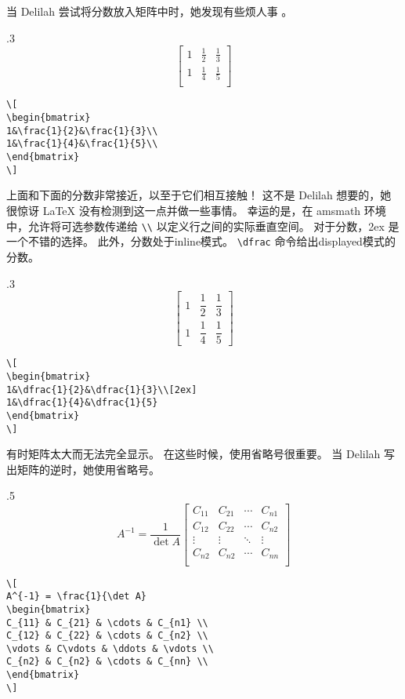 当 Delilah 尝试将分数放入矩阵中时，她发现有些烦人事
。\begin{miniexammar}{.3\textandmarginlen}{
\[
\begin{bmatrix}
1&\frac{1}{2}&\frac{1}{3}\\
1&\frac{1}{4}&\frac{1}{5}\\
\end{bmatrix}
\]
}
\begin{lstlisting}
\[
\begin{bmatrix}
1&\frac{1}{2}&\frac{1}{3}\\
1&\frac{1}{4}&\frac{1}{5}\\
\end{bmatrix}
\]
\end{lstlisting}
\end{miniexammar}
上面和下面的分数非常接近，以至于它们相互接触！ 这不是 Delilah 想要的，她很惊讶 \LaTeX{} 没有检测到这一点并做一些事情。 幸运的是，在 amsmath 环境中，允许将可选参数传递给 \verb=\\= 以定义行之间的实际垂直空间。 对于分数，2ex 是一个不错的选择。 此外，分数处于inline模式。 \verb=\dfrac= 命令给出displayed模式的分数。
\begin{miniexammar}{.3\textandmarginlen}{
\[
\begin{bmatrix}
1&\dfrac{1}{2}&\dfrac{1}{3}\\[2ex]
1&\dfrac{1}{4}&\dfrac{1}{5}
\end{bmatrix}
\]
}
\begin{lstlisting}
\[
\begin{bmatrix}
1&\dfrac{1}{2}&\dfrac{1}{3}\\[2ex]
1&\dfrac{1}{4}&\dfrac{1}{5}
\end{bmatrix}
\]
\end{lstlisting}
\end{miniexammar}

有时矩阵太大而无法完全显示。 在这些时候，使用省略号很重要。 当 Delilah 写出矩阵的逆时，她使用省略号。
\begin{miniexammar}{.5\textandmarginlen}{
\[
A^{-1} = \frac{1}{\det A}
\begin{bmatrix}
C_{11} & C_{21} & \cdots & C_{n1} \\
C_{12} & C_{22} & \cdots & C_{n2} \\
\vdots & \vdots & \ddots & \vdots \\
C_{n2} & C_{n2} & \cdots & C_{nn} \\
\end{bmatrix}
\]
}
\begin{lstlisting}
\[
A^{-1} = \frac{1}{\det A}
\begin{bmatrix}
C_{11} & C_{21} & \cdots & C_{n1} \\
C_{12} & C_{22} & \cdots & C_{n2} \\
\vdots & C\vdots & \ddots & \vdots \\
C_{n2} & C_{n2} & \cdots & C_{nn} \\
\end{bmatrix}
\]
\end{lstlisting}
\end{miniexammar}


